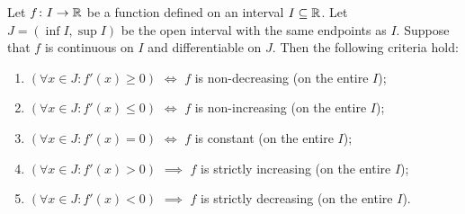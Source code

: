 \begin{theorem}%
\label{th:criteri_monotonia}
\mymark{***}%
%
%
Let $f\colon I \to {\mathbb R}$ be a function defined on an interval $I\subseteq {\mathbb R}$. Let
$J= (\inf I, \sup I)$ be the open interval with the same endpoints as $I$.
Suppose that $f$ is continuous on $I$ and differentiable on $J$. 
Then the following criteria hold:
\begin{enumerate}
\item
$(\forall x \in J\colon f'(x)\ge 0)$
$\iff$
$f$ is non-decreasing (on the entire $I$);
\item
$(\forall x \in J\colon f'(x)\le 0)$
$\iff$
$f$ is non-increasing (on the entire $I$);
\item
$(\forall x \in J\colon f'(x)=0)$
$\iff$
$f$ is constant (on the entire $I$);
\item
$(\forall x \in J\colon f'(x)>0)$
$\implies$
$f$ is strictly increasing (on the entire $I$);
\item
$(\forall x \in J\colon f'(x)<0)$
$\implies$
$f$ is strictly decreasing (on the entire $I$).
\end{enumerate}
\end{theorem}
%
